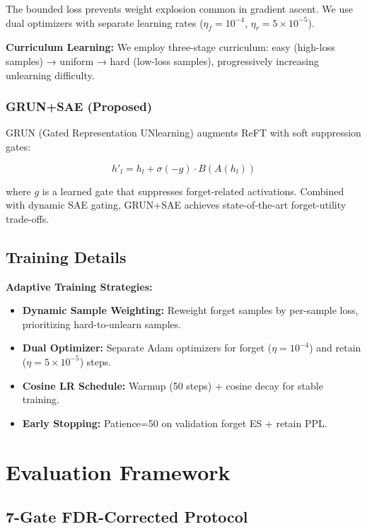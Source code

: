 \documentclass[11pt]{article}
\begin{document}
The bounded loss prevents weight explosion common in gradient ascent. We use dual optimizers with separate learning rates ($\eta_f = 10^{-4}$, $\eta_r = 5 \times 10^{-5}$).

\textbf{Curriculum Learning:} We employ three-stage curriculum: easy (high-loss samples) → uniform → hard (low-loss samples), progressively increasing unlearning difficulty.

\subsubsection{GRUN+SAE (Proposed)}

GRUN (Gated Representation UNlearning) \cite{wu2024reft} augments ReFT \cite{wu2024reft} with soft suppression gates:

\begin{equation}
    h'_l = h_l + \sigma(-g) \cdot B(A(h_l))
\end{equation}

where $g$ is a learned gate that suppresses forget-related activations. Combined with dynamic SAE gating, GRUN+SAE achieves state-of-the-art forget-utility trade-offs.

\subsection{Training Details}

\textbf{Adaptive Training Strategies:}
\begin{itemize}
    \item \textbf{Dynamic Sample Weighting:} Reweight forget samples by per-sample loss, prioritizing hard-to-unlearn samples.
    \item \textbf{Dual Optimizer:} Separate Adam optimizers for forget ($\eta=10^{-4}$) and retain ($\eta=5 \times 10^{-5}$) steps.
    \item \textbf{Cosine LR Schedule:} Warmup (50 steps) + cosine decay for stable training.
    \item \textbf{Early Stopping:} Patience=50 on validation forget ES + retain PPL.
\end{itemize}

\section{Evaluation Framework}

\subsection{7-Gate FDR-Corrected Protocol}
\end{document}
